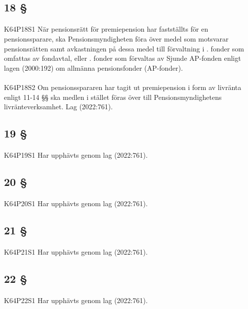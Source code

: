 \documentclass[a4paper,notitlepage,openany,10pt]{book}
\begin{document}
\subsection*{18 §}
\paragraph*{}
{\tiny K64P18S1}
När pensionsrätt för premiepension har fastställts för en pensionssparare, ska Pensionsmyndigheten föra över medel som motsvarar pensionsrätten samt avkastningen på dessa medel till förvaltning i
. fonder som omfattas av fondavtal, eller
. fonder som förvaltas av Sjunde AP-fonden enligt lagen (2000:192) om allmänna pensionsfonder (AP-fonder).
\paragraph*{}
{\tiny K64P18S2}
Om pensionsspararen har tagit ut premiepension i form av livränta enligt 11-14 §§ ska medlen i stället föras över till Pensionsmyndighetens livränteverksamhet.
Lag (2022:761).
\subsection*{19 §}
\paragraph*{}
{\tiny K64P19S1}
Har upphävts genom
lag (2022:761).
\subsection*{20 §}
\paragraph*{}
{\tiny K64P20S1}
Har upphävts genom
lag (2022:761).
\subsection*{21 §}
\paragraph*{}
{\tiny K64P21S1}
Har upphävts genom
lag (2022:761).
\subsection*{22 §}
\paragraph*{}
{\tiny K64P22S1}
Har upphävts genom
lag (2022:761).
\end{document}
